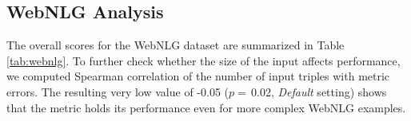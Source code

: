


\subsection{WebNLG Analysis}
\label{sec:webnlg_results}
The overall scores for the WebNLG dataset are summarized in Table \ref{tab:webnlg}. %
To further check whether the size of the input affects performance, we computed Spearman correlation of the number of input triples with metric errors. The resulting very low value of -0.05 ($p=$\,0.02, \emph{Default} setting) shows that the metric holds its performance even for more complex WebNLG examples. %

